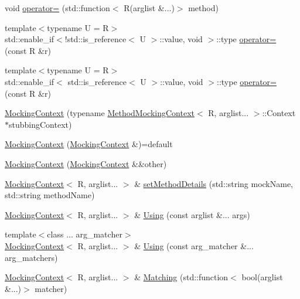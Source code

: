 \begin{DoxyCompactItemize}
\item 
void \mbox{\hyperlink{classfakeit_1_1MockingContext_aadefb2bd6c1dee1f3aa8902277dd3fc2}{operator=}} (std\+::function$<$ R(arglist \&...)$>$ method)
\item 
{\footnotesize template$<$typename U  = R$>$ }\\std\+::enable\+\_\+if$<$!std\+::is\+\_\+reference$<$ U $>$\+::value, void $>$\+::type \mbox{\hyperlink{classfakeit_1_1MockingContext_adfac3df2408adaa86efec81bd5533a6d}{operator=}} (const R \&r)
\item 
{\footnotesize template$<$typename U  = R$>$ }\\std\+::enable\+\_\+if$<$ std\+::is\+\_\+reference$<$ U $>$\+::value, void $>$\+::type \mbox{\hyperlink{classfakeit_1_1MockingContext_ad5e903b223858dbe67f1da1523ef0d60}{operator=}} (const R \&r)
\item 
\mbox{\hyperlink{classfakeit_1_1MockingContext_a5700542bcb10d5ff297e389f9ea988e8}{Mocking\+Context}} (typename \mbox{\hyperlink{classfakeit_1_1MethodMockingContext}{Method\+Mocking\+Context}}$<$ R, arglist... $>$\+::Context $\ast$stubbing\+Context)
\item 
\mbox{\hyperlink{classfakeit_1_1MockingContext_aa4fec015b3088d8d98449f6a90525e0d}{Mocking\+Context}} (\mbox{\hyperlink{classfakeit_1_1MockingContext}{Mocking\+Context}} \&)=default
\item 
\mbox{\hyperlink{classfakeit_1_1MockingContext_a4611ccb2f40b25362c40316ec87c0da5}{Mocking\+Context}} (\mbox{\hyperlink{classfakeit_1_1MockingContext}{Mocking\+Context}} \&\&other)
\item 
\mbox{\hyperlink{classfakeit_1_1MockingContext}{Mocking\+Context}}$<$ R, arglist... $>$ \& \mbox{\hyperlink{classfakeit_1_1MockingContext_a07958a59915dcc84633818a9644e1921}{set\+Method\+Details}} (std\+::string mock\+Name, std\+::string method\+Name)
\item 
\mbox{\hyperlink{classfakeit_1_1MockingContext}{Mocking\+Context}}$<$ R, arglist... $>$ \& \mbox{\hyperlink{classfakeit_1_1MockingContext_ade706bb68e9ffb128fad353a3b15758b}{Using}} (const arglist \&... args)
\item 
{\footnotesize template$<$class ... arg\+\_\+matcher$>$ }\\\mbox{\hyperlink{classfakeit_1_1MockingContext}{Mocking\+Context}}$<$ R, arglist... $>$ \& \mbox{\hyperlink{classfakeit_1_1MockingContext_acb9bd9b011ac2ad88c8d08eebfa101ac}{Using}} (const arg\+\_\+matcher \&... arg\+\_\+matchers)
\item 
\mbox{\hyperlink{classfakeit_1_1MockingContext}{Mocking\+Context}}$<$ R, arglist... $>$ \& \mbox{\hyperlink{classfakeit_1_1MockingContext_a631dd9877017e082b2e1191b02f4c17a}{Matching}} (std\+::function$<$ bool(arglist \&...)$>$ matcher)

\end{DoxyCompactItemize}
